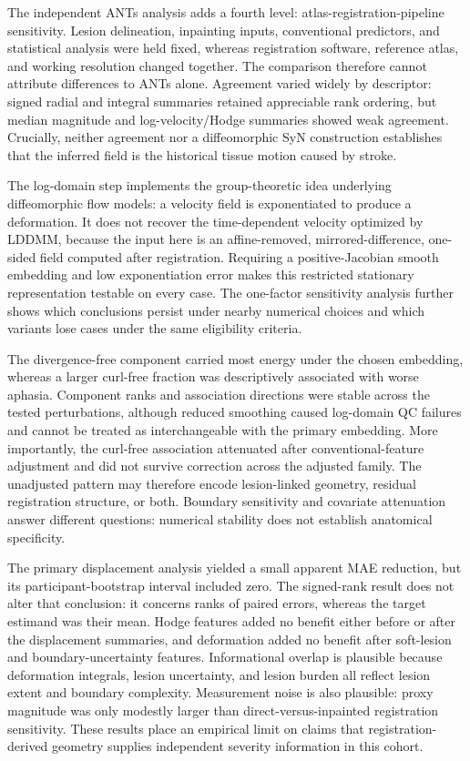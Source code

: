 \documentclass[11pt]{article}
\begin{document}
The independent ANTs analysis adds a fourth level: atlas-registration-pipeline
sensitivity. Lesion delineation, inpainting inputs, conventional predictors,
and statistical analysis were held fixed, whereas registration software,
reference atlas, and working resolution changed together. The comparison
therefore cannot attribute differences to ANTs alone. Agreement varied widely
by descriptor: signed radial and integral summaries retained appreciable rank
ordering, but median magnitude and log-velocity/Hodge summaries showed weak
agreement. Crucially, neither agreement nor a diffeomorphic SyN construction
establishes that the inferred field is the historical tissue motion caused by
stroke.

The log-domain step implements the group-theoretic idea underlying
diffeomorphic flow models: a velocity field is exponentiated to produce a
deformation. It does not recover the time-dependent velocity optimized by
LDDMM, because the input here is an affine-removed, mirrored-difference,
one-sided field computed after registration. Requiring a positive-Jacobian
smooth embedding and low exponentiation error makes this restricted stationary
representation testable on every case. The one-factor sensitivity analysis
further shows which conclusions persist under nearby numerical choices and
which variants lose cases under the same eligibility criteria.

The divergence-free component carried most energy under the chosen embedding,
whereas a larger curl-free fraction was descriptively associated with worse
aphasia. Component ranks and association directions were stable across the
tested perturbations, although reduced smoothing caused
\SensitivitySmoothingEightFailureN{} log-domain QC failures and cannot be
treated as interchangeable with the primary embedding. More importantly, the
curl-free association attenuated after conventional-feature adjustment and did
not survive correction across the adjusted family. The unadjusted pattern may
therefore encode lesion-linked geometry, residual registration structure, or
both. Boundary sensitivity and covariate attenuation answer different
questions: numerical stability does not establish anatomical specificity.

The primary displacement analysis yielded a small apparent MAE reduction, but
its participant-bootstrap interval included zero. The signed-rank result does
not alter that conclusion: it concerns ranks of paired errors, whereas the
target estimand was their mean. Hodge features added no benefit either before
or after the displacement summaries, and deformation added no benefit after
soft-lesion and boundary-uncertainty features. Informational overlap is
plausible because deformation integrals, lesion uncertainty, and lesion burden
all reflect lesion extent and boundary complexity. Measurement noise is also
plausible: proxy magnitude was only modestly larger than
direct-versus-inpainted registration sensitivity. These results place an
empirical limit on claims that registration-derived geometry supplies
independent severity information in this cohort.
\end{document}
